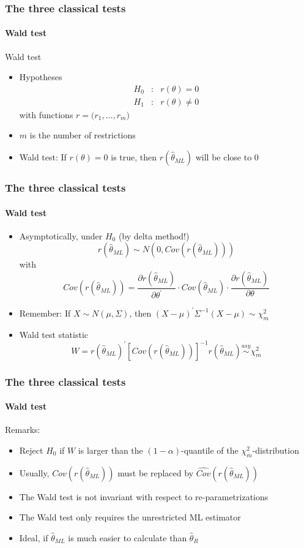 \documentclass[notes=show]{beamer}
\begin{document}
\begin{frame}\frametitle{The three classical tests}\framesubtitle{Wald test}
Wald test
\begin{itemize}
    \item Hypotheses%
    \begin{eqnarray*}
        H_{0} &:&r(\theta )=0 \\
        H_{1} &:&r(\theta )\neq 0
    \end{eqnarray*}%
    with functions $r\mathbf{=(}r_{1},\ldots ,r_{m})$
    \item $m$ is the number of restrictions
    \item Wald test: If $r(\theta )=0$ is true, then $r(\hat{\theta}_{ML})$ will be close to 0
\end{itemize}
\end{frame}


\begin{frame}\frametitle{The three classical tests}\framesubtitle{Wald test}
\begin{itemize}
    \item Asymptotically, under $H_{0}$ (by delta method!)
    \begin{equation*}
        r(\hat{\theta}_{ML})\sim N\left( 0,Cov(r(\hat{\theta}_{ML}))\right)
    \end{equation*}
    with
    \begin{equation*}
        Cov(r(\hat{\theta}_{ML}))=\frac{\partial r(\hat{\theta}_{ML})}{\partial\theta ^{\prime }}\cdot Cov(\hat{\theta}_{ML})\cdot \frac{\partial r(\hat{\theta}_{ML})}{\partial \theta }
    \end{equation*}
    \item Remember: If $X\sim N(\mu ,\Sigma )$, then $\left( X-\mu \right)^{\prime }\Sigma ^{-1}\left( X-\mu \right) \sim \chi _{m}^{2}$
    \item Wald test statistic
    \begin{equation*}
    W=r(\hat{\theta}_{ML})^{\prime }\left[ Cov(r(\hat{\theta}_{ML}))\right]^{-1}r(\hat{\theta}_{ML})\overset{asy}{\sim }\chi _{m}^{2}
    \end{equation*}
\end{itemize}
\end{frame}


\begin{frame}\frametitle{The three classical tests}\framesubtitle{Wald test}
Remarks:
\begin{itemize}
    \item Reject $H_{0}$ if $W$ is larger than the $\left( 1-\alpha \right)$-quantile of the $\chi _{m}^{2}$-distribution
    \item Usually, $Cov(r(\hat{\theta}_{ML}))$ must be replaced by $\widehat{Cov}(r(\hat{\theta}_{ML}))$
    \item The Wald test is not invariant with respect to re-parametrizations
    \item The Wald test only requires the unrestricted ML estimator
    \item Ideal, if $\hat{\theta}_{ML}$ is much easier to calculate than $\hat{\theta}_{R}$
\end{itemize}
\end{frame}
\end{document}
